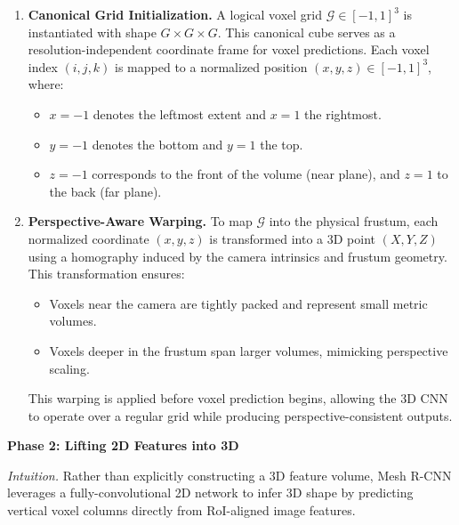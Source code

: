 \begin{enumerate}[label=\textbf{Step \arabic*:}, leftmargin=1.8em]
    \item \textbf{Canonical Grid Initialization.}  
    A logical voxel grid \( \mathcal{G} \in [-1,1]^3 \) is instantiated with shape \( G \times G \times G \). This canonical cube serves as a resolution-independent coordinate frame for voxel predictions. Each voxel index \( (i, j, k) \) is mapped to a normalized position \( (x, y, z) \in [-1,1]^3 \), where:
    \begin{itemize}
        \item \( x = -1 \) denotes the leftmost extent and \( x = 1 \) the rightmost.
        \item \( y = -1 \) denotes the bottom and \( y = 1 \) the top.
        \item \( z = -1 \) corresponds to the front of the volume (near plane), and \( z = 1 \) to the back (far plane).
    \end{itemize}
    
    \item \textbf{Perspective-Aware Warping.}  
    To map \( \mathcal{G} \) into the physical frustum, each normalized coordinate \( (x, y, z) \) is transformed into a 3D point \( (X, Y, Z) \) using a homography induced by the camera intrinsics and frustum geometry. This transformation ensures:
    \begin{itemize}
        \item Voxels near the camera are tightly packed and represent small metric volumes.
        \item Voxels deeper in the frustum span larger volumes, mimicking perspective scaling.
    \end{itemize}
    This warping is applied before voxel prediction begins, allowing the 3D CNN to operate over a regular grid while producing perspective-consistent outputs.
\end{enumerate}

\noindent
\textbf{Phase 2: Lifting 2D Features into 3D}

\medskip
\noindent
\emph{Intuition.} Rather than explicitly constructing a 3D feature volume, Mesh R-CNN leverages a fully-convolutional 2D network to infer 3D shape by predicting vertical voxel columns directly from RoI-aligned image features.


